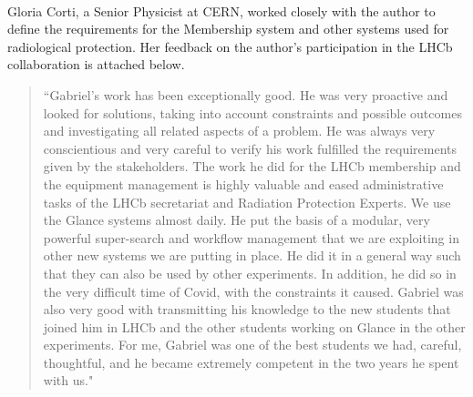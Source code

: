 \paragraph{} Gloria Corti, a Senior Physicist at CERN, worked closely with the author to define the requirements for the Membership system and other systems used for radiological protection. Her feedback on the author's participation in the LHCb collaboration is attached below.

\begin{quote}
``Gabriel's work has been exceptionally good. He was very proactive and looked for solutions, taking into account constraints and possible outcomes and investigating all related aspects of a problem. He was always very conscientious and very careful to verify his work fulfilled the requirements given by the stakeholders. The work he did for the LHCb membership and the equipment management is highly valuable and eased administrative tasks of the LHCb secretariat and Radiation Protection Experts. We use the Glance systems almost daily. He put the basis of a modular, very powerful super-search and workflow management that we are exploiting in other new systems we are putting in place. He did it in a general way such that they can also be used by other experiments. In addition, he did so in the very difficult time of Covid, with the constraints it caused. Gabriel was also very good with transmitting his knowledge to the new students that joined him in LHCb and the other students working on Glance in the other experiments. For me, Gabriel was one of the best students we had, careful, thoughtful, and he became extremely competent in the two years he spent with us."
\end{quote}
